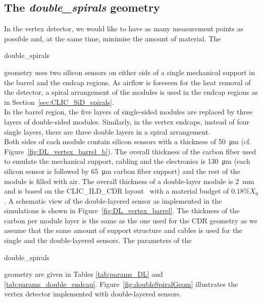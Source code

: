 \subsection{The \emph{double\_spirals} geometry}\label{sec:CLIC_SiD_double_spirals}

In the vertex detector, we would like to have as many measurement points as possible and, at the same time, minimise the amount of material. The \begin{it}double\_spirals\end{it} geometry uses two silicon sensors on either side of a single mechanical support in the barrel and the endcap regions. As airflow is foreseen for the heat removal of the detector, a spiral arrangement of the modules is used in the endcap regions as in Section~\ref{sec:CLIC_SiD_spirals}. \\
In the barrel region, the five layers of single-sided modules are replaced by three layers of double-sided modules. Similarly, in the vertex endcaps, instead of four single layers, there are three double layers in a spiral arrangement.\\
Both sides of each module contain silicon sensors with a thickness of \SI{50}{\micro\meter} (cf. Figure~\ref{fig:DL_vertex_barrel_b}). The overall thickness of the carbon fiber used to emulate the mechanical support, cabling and the electronics is \SI{130}{\micro\meter} (each silicon sensor is followed by \SI{65}{\micro\meter} carbon fiber support) and the rest of the module is filled with air. The overall thickness of a double-layer module is \SI{2}{\milli\meter} and is based on the CLIC\_ILD\_CDR layout~\cite{Muennich:1443543} with a material budget of $0.18\%X_{0}$. A schematic view of the double-layered sensor as implemented in the simulations is shown in Figure~\ref{fig:DL_vertex_barrel}. The thickness of the carbon per module layer is the same as the one used for the CDR geometry as we assume that the same amount of support structure and cables is used for the single and the double-layered sensors. The parameters of the \begin{it}double\_spirals\end{it} geometry are given in Tables \ref{tab:params_DL} and \ref{tab:params_double_endcap}.
Figure~\ref{fig:doubleSpiralGeom} illustrates the vertex detector
implemented with double-layered sensors.
